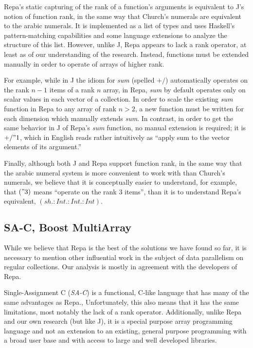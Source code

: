 Repa's static capturing of the rank of a function's arguments is equivalent to J's notion of function rank, 
in the same way that Church's numerals are equivalent to the arabic numerals. %
It is implemented as a list of types and uses Haskell's pattern-matching capabilities and some language extensions 
to analyze the structure of this list.
However, unlike J, Repa appears to lack a rank operator, at least as of our understanding of the research.
Instead, functions must be extended manually in order to operate of arrays of higher rank.

For example, while in J the idiom for \textit{sum} (spelled $+/$) automatically operates on the rank $n-1$ items of a rank $n$ array, 
in Repa, \textit{sum} by default operates only on scalar values in each vector of a collection.
In order to scale the existing \textit{sum} function in Repa to any array of rank $n > 2$, 
a new function must be written for each dimension which manually extends \textit{sum}.
In contrast, in order to get the same behavior in J of Repa's \textit{sum} function, no manual extension is required; 
it is $+/ " 1$, which in English reads rather intuitively as ``apply sum to the vector elements of its argument.''

Finally, although both J and Repa support function rank, 
in the same way that the arabic numeral system is more convenient to work with than Church's numerals, 
we believe that it is conceptually easier to understand, for example, that $(" 3)$ means ``operate on the rank 3 items'', than it is to understand Repa's equivalent, $(sh.:Int.:Int.:Int)$.

\subsection{SA-C, Boost MultiArray}
While we believe that Repa is the best of the solutions we have found so far, 
it is necessary to mention other influential work in the subject of data parallelism on regular collections.
Our analysis is mostly in agreement with the developers of Repa.\cite{dph}

Single-Assignment C (\textit{SA-C}) is a functional, C-like language 
that has many of the same advantages as Repa.\cite{dph}, \cite{sac}
Unfortunately, this also means that it has the same limitations, most notably the lack of a rank operator.
Additionally, unlike Repa and our own research (but like J), 
it is a special purpose array programming language and 
not an extension to an existing, general purpose programming with a broad user base and 
with access to large and well developed libraries.

